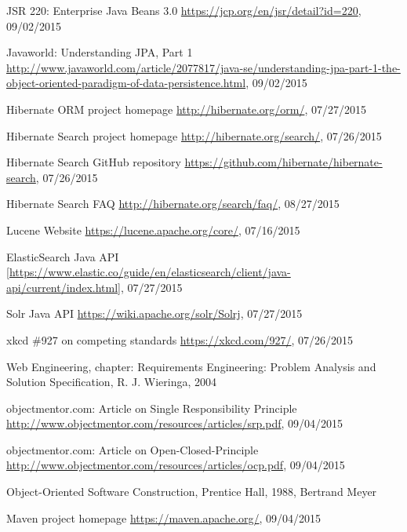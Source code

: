 \begin{thebibliography}{100}

	 JSR 220: Enterprise Java Beans 3.0
	\url{https://jcp.org/en/jsr/detail?id=220}, 09/02/2015

	 Javaworld: Understanding JPA, Part 1
	\url{http://www.javaworld.com/article/2077817/java-se/understanding-jpa-part-1-the-object-oriented-paradigm-of-data-persistence.html}, 09/02/2015

	 Hibernate ORM project homepage
	\url{http://hibernate.org/orm/}, 07/27/2015

	 Hibernate Search project homepage
	\url{http://hibernate.org/search/}, 07/26/2015

	 Hibernate Search GitHub repository
	\url{https://github.com/hibernate/hibernate-search}, 07/26/2015

	 Hibernate Search FAQ
	\url{http://hibernate.org/search/faq/}, 08/27/2015

	 Lucene Website
	\url{https://lucene.apache.org/core/}, 07/16/2015

	 ElasticSearch Java API
	\url{[https://www.elastic.co/guide/en/elasticsearch/client/java-api/current/index.html]}, 07/27/2015

	 Solr Java API
	\url{https://wiki.apache.org/solr/Solrj}, 07/27/2015

	 xkcd \#927 on competing standards
	\url{https://xkcd.com/927/}, 07/26/2015

	 Web Engineering, chapter: Requirements Engineering: Problem Analysis and Solution Specification, R. J. Wieringa, 2004

	 objectmentor.com: Article on Single Responsibility Principle
	\url{http://www.objectmentor.com/resources/articles/srp.pdf}, 09/04/2015

	 objectmentor.com: Article on Open-Closed-Principle
	\url{http://www.objectmentor.com/resources/articles/ocp.pdf}, 09/04/2015

	 Object-Oriented Software Construction, Prentice Hall, 1988, Bertrand Meyer

	 Maven project homepage
	\url{https://maven.apache.org/}, 09/04/2015


\end{thebibliography}
